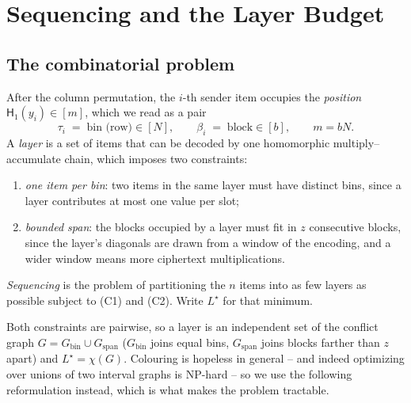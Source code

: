 %
%

\section{Sequencing and the Layer Budget}
\label{sec:sequencing}

\subsection{The combinatorial problem}

After the column permutation, the $i$-th sender item occupies the
\emph{position} $\mathsf{H}_1(y_i) \in [m]$, which we read as a pair
\[
  \tau_i \;=\; \text{bin (row)} \in [N],
  \qquad
  \beta_i \;=\; \text{block} \in [b],
  \qquad m = bN .
\]
A \emph{layer} is a set of items that can be decoded by one homomorphic
multiply--accumulate chain, which imposes two constraints:

\begin{enumerate}
  \item[(C1)] \emph{one item per bin}: two items in the same layer must have
        distinct bins, since a layer contributes at most one value per slot;
  \item[(C2)] \emph{bounded span}: the blocks occupied by a layer must fit in
        $z$ consecutive blocks, since the layer's diagonals are drawn from a
        window of the encoding, and a wider window means more ciphertext
        multiplications.
\end{enumerate}

\emph{Sequencing} is the problem of partitioning the $n$ items into as few
layers as possible subject to (C1) and (C2). Write $L^\star$ for that minimum.

Both constraints are pairwise, so a layer is an independent set of the
conflict graph $G = G_{\mathrm{bin}} \cup G_{\mathrm{span}}$ ($G_{\mathrm{bin}}$
joins equal bins, $G_{\mathrm{span}}$ joins blocks farther than $z$ apart) and
$L^\star = \chi(G)$. Colouring is hopeless in general -- and indeed optimizing
over unions of two interval graphs is NP-hard -- so we use the following
reformulation instead, which is what makes the problem tractable.

